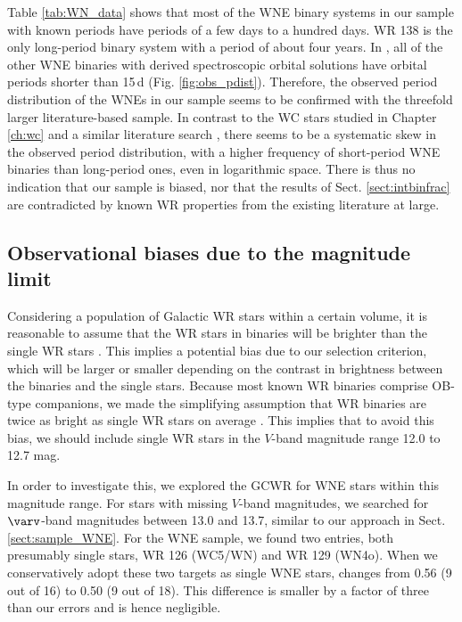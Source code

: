 Table \ref{tab:WN_data} shows that most of
the WNE binary systems in our sample with known periods have periods of a few days to a hundred days. WR 138 is the only long-period binary system with a period of about four years. In , all of the other WNE binaries with derived spectroscopic orbital solutions have orbital periods shorter than 15\,d (Fig. \ref{fig:obs_pdist}). Therefore, the observed period distribution of the WNEs in our sample seems to be confirmed with the threefold larger literature-based sample. In contrast to the WC stars studied in Chapter \ref{ch:wc} and a similar literature search , there seems to be a systematic skew in the observed period distribution, with a higher frequency of short-period WNE binaries than long-period ones, even in logarithmic space. There is thus no indication that our sample is biased, nor that the results of Sect. \ref{sect:intbinfrac} are contradicted by known WR properties from the existing literature at large.

\subsection{Observational biases due to the magnitude limit} \label{sect:obsbias_brightness}

Considering a population of Galactic WR stars within a certain volume, it is reasonable to assume that the WR stars in binaries will be brighter than the single WR stars \citep{1980VanbeverenConti}. This implies a potential bias due to our selection criterion, which will be larger or smaller depending on the contrast in brightness between the binaries and the single stars.
Because most known WR binaries comprise OB-type companions, we made the simplifying assumption that WR binaries are twice as bright as single WR stars on average \citep[e.g.][]{2019Shenar}. This implies that to avoid this bias, we should include single WR stars in the $V$-band magnitude range 12.0 to 12.7 mag.

In order to investigate this, we explored the GCWR for WNE stars within this magnitude range. For stars with missing $V$-band magnitudes, we searched for $\varv$-band magnitudes between 13.0 and 13.7, similar to our approach in Sect. \ref{sect:sample_WNE}. For the WNE sample, we found two entries, both presumably single stars, WR 126 (WC5/WN) and WR 129 (WN4o). When we conservatively adopt these two targets as single WNE stars, \fintWNE{} changes from 0.56 (9 out of 16) to 0.50 (9 out of 18). This difference is smaller by a factor of three than our errors and is hence negligible.

